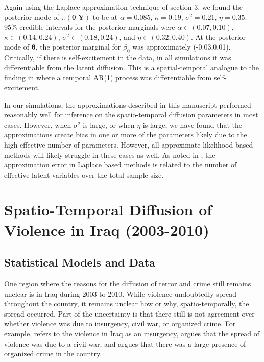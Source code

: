 \documentclass[11pt]{isuthesis}
\begin{document}
Again using the Laplace approximation technique of section 3, we found the posterior mode of $\pi(\boldsymbol{\theta}|\boldsymbol{Y})$ to be at $\alpha=0.085$, $\kappa=0.19$, $\sigma^2=0.21$, $\eta=0.35$.  95\% credible intervals for the posterior marginals were $\alpha \in (0.07, 0.10)$, $\kappa \in (0.14,0.24)$, $\sigma^2 \in (0.18,0.24)$, and $\eta \in (0.32, 0.40)$.  At the posterior mode of $\boldsymbol{\theta}$, the  posterior marginal for $\beta_0$ was approximately (-0.03,0.01).  Critically, if there is self-excitement in the data, in all simulations it was differentiable from the latent diffusion.  This is a spatial-temporal analogue to the finding in \cite{mohler2013modeling} where a temporal AR(1) process was differentiable from self-excitement.


In our simulations, the approximations described in this manuscript performed reasonably well for inference on the spatio-temporal diffusion parameters in most cases.  However, when $\sigma^2$ is large, or when $\eta$ is large, we have found that the approximations create bias in one or more of the parameters likely due to the high effective number of parameters.  However, all approximate likelihood based methods will likely struggle in these cases as well.  As noted in \cite{rue2009approximate}, the approximation error in Laplace based methods is related to the number of effective latent variables over the total sample size.


\section{Spatio-Temporal Diffusion of Violence in Iraq (2003-2010)}

\subsection{Statistical Models and Data}

One region where the reasons for the diffusion of terror and crime still remains unclear is in Iraq during 2003 to 2010.  While violence undoubtedly spread throughout the country, it remains unclear how or why, spatio-temporally, the spread occurred.  Part of the uncertainty is that there still is not agreement over whether violence was due to insurgency, civil war, or organized crime. For example, \cite{hoffman2006insurgency} refers to the violence in Iraq as an insurgency, \cite{fearon2007iraq} argues that the spread of violence was due to a civil war, and \cite{williams2009criminals} argues that there was a large presence of organized crime in the country.  
\end{document}
